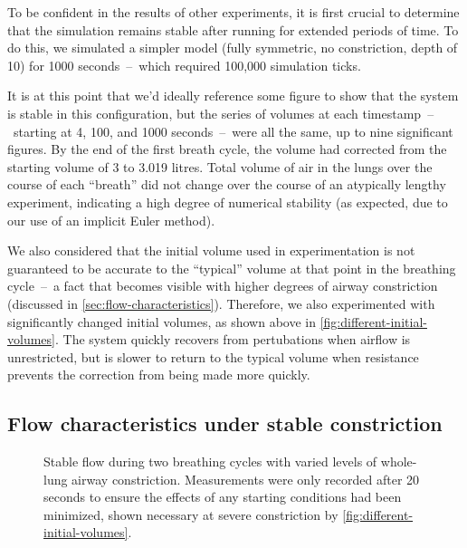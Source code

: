 To be confident in the results of other experiments, it is first crucial to determine that the
simulation remains stable after running for extended periods of time. To do this, we simulated a
simpler model (fully symmetric, no constriction, depth of 10) for 1000 seconds~--~which required
100,000 simulation ticks.

It is at this point that we'd ideally reference some figure to show that the system is stable in
this configuration, but the series of volumes at each timestamp~--~starting at 4, 100, and 1000
seconds~--~were all the same, up to nine significant figures. By the end of the first breath cycle,
the volume had corrected from the starting volume of 3 to 3.019 litres. Total volume of air in the
lungs over the course of each ``breath'' did not change over the course of an atypically lengthy
experiment, indicating a high degree of numerical stability (as expected, due to our use of an
implicit Euler method).

\breakpars

We also considered that the initial volume used in experimentation is not guaranteed to be accurate
to the ``typical'' volume at that point in the breathing cycle~--~a fact that becomes visible with
higher degrees of airway constriction (discussed in \autoref{sec:flow-characteristics}). Therefore,
we also experimented with significantly changed initial volumes, as shown above in
\autoref{fig:different-initial-volumes}. The system quickly recovers from pertubations when airflow
is unrestricted, but is slower to return to the typical volume when resistance prevents the
correction from being made more quickly.

\subsection{Flow characteristics under stable constriction} \label{sec:flow-characteristics}

\begin{figure}[ht!]
    \centering
    \begin{tikzpicture}
        
    \end{tikzpicture}
    \caption{
        Stable flow during two breathing cycles with varied levels of whole-lung airway
        constriction. Measurements were only recorded after 20 seconds to ensure the effects of any
        starting conditions had been minimized, shown necessary at severe constriction by
        \autoref{fig:different-initial-volumes}.
    }
    \label{fig:constricted-flow-characteristics}
\end{figure}

